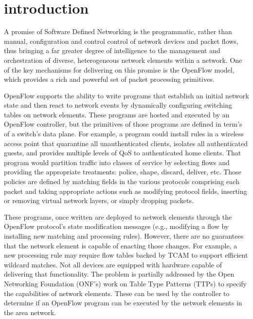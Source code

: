 
\section{introduction}
\label{sec:ref}

A promise of Software Defined Networking is the programmatic, rather
than manual, configuration and control control of network devices and packet 
flows, thus bringing a far greater degree of intelligence to the management and
orchestration of diverse, heterogeneous network elements within a
network. One of the key mechanisms for delivering on this promise is
the OpenFlow model, which provides a rich and powerful set of packet 
processing primitives.


OpenFlow supports the ability to write programs that establish an initial
network state and then react to network events by dynamically configuring 
switching tables on network elements. These programs are hosted and executed by 
an OpenFlow controller, but the primitives of those programs are
defined in term's of a switch's data plane. For example, a program could install
rules in a wireless access point that quarantine all unauthenticated clients, 
isolates all authenticated guests, and provides multiple levels of QoS to
authenticated home clients. That program would partition traffic into classes of
service by selecting flows and providing the appropriate treatments: police,
shape, discard, deliver, etc. 
Those policies are defined by matching fields in the various protocols 
comprising each packet and taking appropriate actions such as modifying 
protocol fields, inserting or removing virtual network layers, or simply
dropping packets.

These programs, once written are deployed to network elements through the
OpenFlow protocol's state modification messages (e.g., modifying a flow
by installing new matching and processing rules). However, there are no
guarantees that the network element is capable of enacting those changes.
For example, a new processing rule may require flow tables backed by
TCAM to support efficient wildcard matches. Not all devices are equipped
with hardware capable of delivering that functionality. The problem is
partially addressed by the Open Networking Foundation (ONF's) work on
Table Type Patterns (TTPs) to specify the capabilities of network elements.
These can be used by the controller to determine if an OpenFlow program
can be executed by the network elements in the area network.

